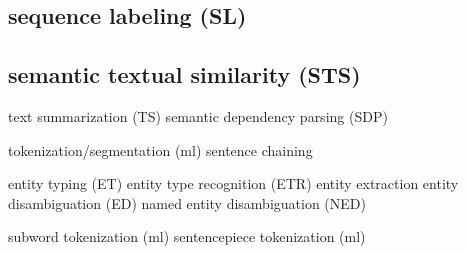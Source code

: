 \subsection{sequence labeling (SL)} \label{nlptask:sequencelabelingSL}

\subsection{semantic textual similarity (STS)} \label{nlptask:semantictextualsimilaritySTS}




text summarization (TS)
semantic dependency parsing (SDP)

tokenization/segmentation (ml)
sentence chaining

entity typing (ET)
entity type recognition (ETR)
entity extraction
entity disambiguation (ED)
named entity disambiguation (NED)


subword tokenization (ml)
sentencepiece tokenization (ml)
